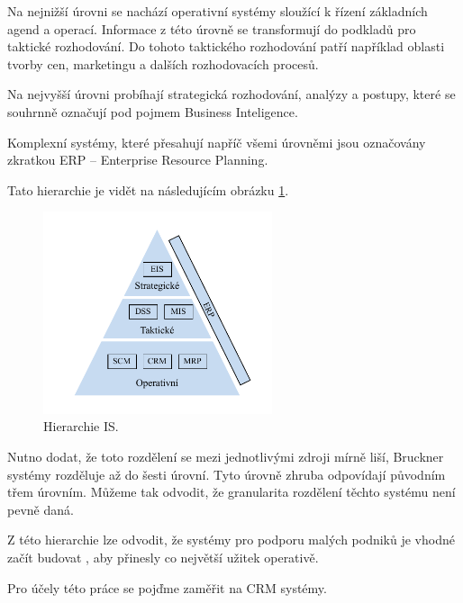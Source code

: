 Na nejnižší úrovni se nachází operativní systémy sloužící k řízení základních agend a operací. Informace z této úrovně se transformují do podkladů pro taktické rozhodování. Do tohoto taktického rozhodování patří například oblasti tvorby cen, marketingu a dalších rozhodovacích procesů.

Na nejvyšší úrovni probíhají strategická rozhodování, analýzy a postupy, které se souhrnně označují pod pojmem Business Inteligence. \cite{Vymetal2009}

Komplexní systémy, které přesahují napříč všemi úrovněmi jsou označovány zkratkou ERP -- Enterprise Resource Planning.

Tato hierarchie je vidět na následujícím obrázku \ref{fig:IS_hierarchy}.

\begin{figure}[h!]
    \centering
    \includegraphics[width=0.6\textwidth]{assets/2_IS/IS_hierarchy.drawio.pdf}
    \caption{Hierarchie IS.}
    \label{fig:IS_hierarchy}
\end{figure}
\FloatBarrier

Nutno dodat, že toto rozdělení se mezi jednotlivými zdroji mírně liší, Bruckner \cite{Bruckner2012} systémy rozděluje až do šesti úrovní. Tyto úrovně zhruba odpovídají původním třem úrovním. Můžeme tak odvodit, že granularita rozdělení těchto systému není pevně daná.

Z této hierarchie lze odvodit, že systémy pro podporu malých podniků je vhodné začít budovat , aby přinesly co největší užitek operativě. 

Pro účely této práce se pojďme zaměřit na CRM systémy.

